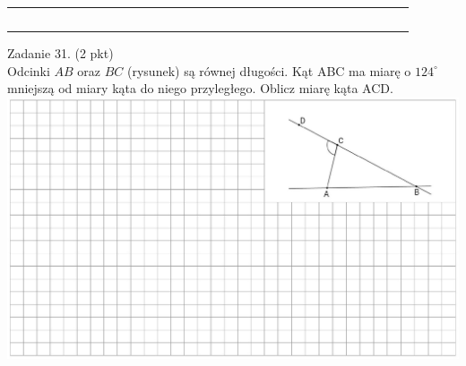 \documentclass[10pt]{article}
\begin{document}
\begin{center}
\begin{tabular}{|c|c|c|c|c|c|c|c|c|c|c|c|c|c|c|c|c|c|c|c|c|c|c|c|c|c|c|c|c|c|c|c|}
 &  &  &  &  &  &  &  &  &  &  &  &  &  &  &  &  &  &  &  &  &  &  &  &  &  &  &  &  &  &  &  \\
\hline
 &  &  &  &  &  &  &  &  &  &  &  &  &  &  &  &  &  &  &  &  &  &  &  &  &  &  &  &  &  &  &  \\
\hline
 &  &  &  &  &  &  &  &  &  &  &  &  &  &  &  &  &  &  &  &  &  &  &  &  &  &  &  &  &  &  &  \\
\hline
 &  &  &  &  &  &  &  &  &  &  &  &  &  &  &  &  &  &  &  &  &  &  &  &  &  &  &  &  &  &  &  \\
\hline
 &  &  &  &  &  &  &  &  &  &  &  &  &  &  &  &  &  &  &  &  &  &  &  &  &  &  &  &  &  &  &  \\
\hline
 &  &  &  &  &  &  &  &  &  &  &  &  &  &  &  &  &  &  &  &  &  &  &  &  &  &  &  &  &  &  &  \\
\hline
\end{tabular}
\end{center}

Zadanie 31. (2 pkt)\\
Odcinki \(A B\) oraz \(B C\) (rysunek) są równej długości. Kąt ABC ma miarę o \(124^{\circ}\) mniejszą od miary kąta do niego przyległego. Oblicz miarę kąta ACD.\\
\includegraphics[max width=\textwidth, center]{2024_11_21_0fa17f80dfe1c6bd3b66g-10}
\end{document}
